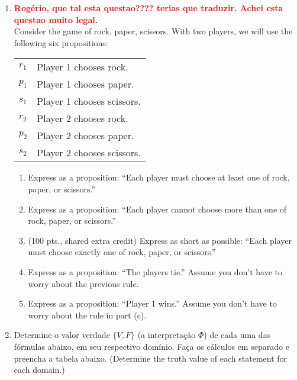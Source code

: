 \documentclass[a4paper,12pt]{article}
\begin{document}
\begin{enumerate}
\item \textbf{\textcolor{red}{Rogério, que tal esta questao???? terias que traduzir. Achei esta questao muito legal.}}\\ Consider the game of rock, paper, scissors.
  With two players, we will use the following six propositions:

\begin{center}
\begin{tabular}{ll}
$r_1$ & Player 1 chooses rock. \\
$p_1$ & Player 1 chooses paper. \\
$s_1$ & Player 1 chooses scissors. \\
$r_2$ & Player 2 chooses rock. \\
$p_2$ & Player 2 chooses paper. \\
$s_2$ & Player 2 chooses scissors.
\end{tabular}
\end{center}

\begin{enumerate}
\setlength{\itemsep}{-2pt} 
\item Express as a proposition: ``Each player must choose at least one
  of rock, paper, or scissors.''

\item Express as a proposition: ``Each player cannot choose more than
  one of rock, paper, or scissors.''

\item (100 pts., shared extra credit) Express as short as possible:
``Each player must choose exactly one of rock, paper, or scissors.''

\item Express as a proposition: ``The players tie.''  Assume you don't
  have to worry about the previous rule.

\item Express as a proposition: ``Player 1 wins.''
Assume you don't have to worry about the rule in part (c).
\end{enumerate}

\item Determine o valor verdade $\{V, F \}$ (a interpretação $\Phi $)
de cada uma das fórmulas abaixo, em seu respectivo domínio.
Faça os cálculos em separado e preencha a tabela abaixo.
(Determine the truth value of each statement for each domain.)


\end{enumerate}
\end{document}
